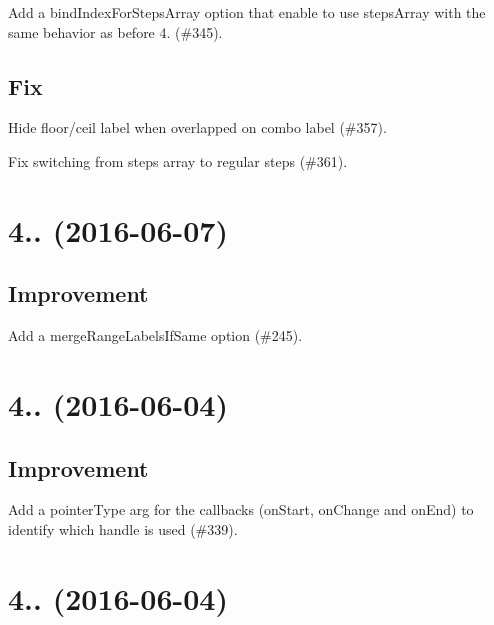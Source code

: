 \begin{DoxyItemize}
\item Add a {\ttfamily bind\+Index\+For\+Steps\+Array} option that enable to use {\ttfamily steps\+Array} with the same behavior as before 4. (\#345).
\end{DoxyItemize}

\subsection*{Fix}


\begin{DoxyItemize}
\item Hide floor/ceil label when overlapped on combo label (\#357).
\item Fix switching from steps array to regular steps (\#361).
\end{DoxyItemize}

\section*{4.. (2016-\/06-\/07)}

\subsection*{Improvement}


\begin{DoxyItemize}
\item Add a {\ttfamily merge\+Range\+Labels\+If\+Same} option (\#245).
\end{DoxyItemize}

\section*{4.. (2016-\/06-\/04)}

\subsection*{Improvement}


\begin{DoxyItemize}
\item Add a pointer\+Type arg for the callbacks (on\+Start, on\+Change and on\+End) to identify which handle is used (\#339).
\end{DoxyItemize}

\section*{4.. (2016-\/06-\/04)}

